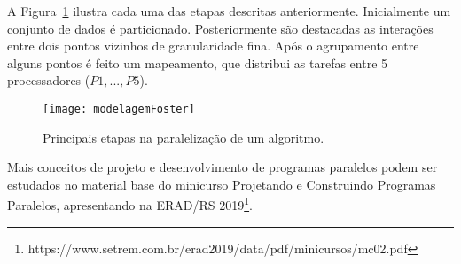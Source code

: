 A Figura~\ref{fig:modelagemFoster} ilustra cada uma das etapas descritas anteriormente. Inicialmente um conjunto de dados é particionado. Posteriormente são destacadas as interações entre dois pontos vizinhos de granularidade fina. Após o agrupamento entre alguns pontos é feito um mapeamento, que distribui as tarefas entre 5 processadores ($P1,...,P5$).


\begin{figure}[!htbp]
	\centerline{\texttt{[image: modelagemFoster]}}
	\caption{Principais etapas na paralelização de um algoritmo.}
	\label{fig:modelagemFoster}
\end{figure}

Mais conceitos de projeto e desenvolvimento de programas paralelos podem ser estudados no material base do minicurso Projetando e Construindo Programas Paralelos, apresentando na ERAD/RS 2019\footnote{https://www.setrem.com.br/erad2019/data/pdf/minicursos/mc02.pdf}.